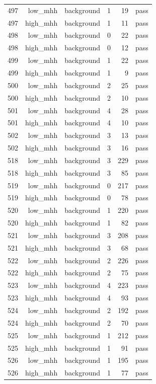 \begin{table}[htbp]
{\begin{tabular}{lrrrrr}
497 & low\_mhh & background & 1 & 19 & pass \\
497 & high\_mhh & background & 1 & 11 & pass \\
498 & low\_mhh & background & 0 & 22 & pass \\
498 & high\_mhh & background & 0 & 12 & pass \\
499 & low\_mhh & background & 1 & 22 & pass \\
499 & high\_mhh & background & 1 & 9 & pass \\
500 & low\_mhh & background & 2 & 25 & pass \\
500 & high\_mhh & background & 2 & 10 & pass \\
501 & low\_mhh & background & 4 & 28 & pass \\
501 & high\_mhh & background & 4 & 10 & pass \\
502 & low\_mhh & background & 3 & 13 & pass \\
502 & high\_mhh & background & 3 & 16 & pass \\
518 & low\_mhh & background & 3 & 229 & pass \\
518 & high\_mhh & background & 3 & 85 & pass \\
519 & low\_mhh & background & 0 & 217 & pass \\
519 & high\_mhh & background & 0 & 78 & pass \\
520 & low\_mhh & background & 1 & 220 & pass \\
520 & high\_mhh & background & 1 & 82 & pass \\
521 & low\_mhh & background & 3 & 208 & pass \\
521 & high\_mhh & background & 3 & 68 & pass \\
522 & low\_mhh & background & 2 & 226 & pass \\
522 & high\_mhh & background & 2 & 75 & pass \\
523 & low\_mhh & background & 4 & 223 & pass \\
523 & high\_mhh & background & 4 & 93 & pass \\
524 & low\_mhh & background & 2 & 192 & pass \\
524 & high\_mhh & background & 2 & 70 & pass \\
525 & low\_mhh & background & 1 & 212 & pass \\
525 & high\_mhh & background & 1 & 91 & pass \\
526 & low\_mhh & background & 1 & 195 & pass \\
526 & high\_mhh & background & 1 & 77 & pass \\

\end{tabular}}
\end{table}
